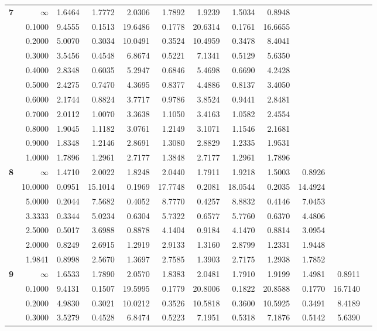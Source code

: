 \begin{table}[!htb]
\begin{center}
{\begin{tabular}{|c||r|r|r|r|r|r|r|r|r|r|r|}
\textbf{ 7}&$\infty$&1.6464&1.7772&2.0306&1.7892&1.9239&1.5034&0.8948&     &     &     \\
&0.1000&9.4555&0.1513&19.6486&0.1778&20.6314&0.1761&16.6655&     &     &     \\
&0.2000&5.0070&0.3034&10.0491&0.3524&10.4959&0.3478&8.4041&     &     &     \\
&0.3000&3.5456&0.4548&6.8674&0.5221&7.1341&0.5129&5.6350&     &     &     \\
&0.4000&2.8348&0.6035&5.2947&0.6846&5.4698&0.6690&4.2428&     &     &     \\
&0.5000&2.4275&0.7470&4.3695&0.8377&4.4886&0.8137&3.4050&     &     &     \\
&0.6000&2.1744&0.8824&3.7717&0.9786&3.8524&0.9441&2.8481&     &     &     \\
&0.7000&2.0112&1.0070&3.3638&1.1050&3.4163&1.0582&2.4554&     &     &     \\
&0.8000&1.9045&1.1182&3.0761&1.2149&3.1071&1.1546&2.1681&     &     &     \\
&0.9000&1.8348&1.2146&2.8691&1.3080&2.8829&1.2335&1.9531&     &     &     \\
&1.0000&1.7896&1.2961&2.7177&1.3848&2.7177&1.2961&1.7896&     &     &     \\ \hline
\textbf{ 8}&$\infty$&1.4710&2.0022&1.8248&2.0440&1.7911&1.9218&1.5003&0.8926&     &     \\
&10.0000&0.0951&15.1014&0.1969&17.7748&0.2081&18.0544&0.2035&14.4924&     &     \\
&5.0000&0.2044&7.5682&0.4052&8.7770&0.4257&8.8832&0.4146&7.0453&     &     \\
&3.3333&0.3344&5.0234&0.6304&5.7322&0.6577&5.7760&0.6370&4.4806&     &     \\
&2.5000&0.5017&3.6988&0.8878&4.1404&0.9184&4.1470&0.8814&3.0954&     &     \\
&2.0000&0.8249&2.6915&1.2919&2.9133&1.3160&2.8799&1.2331&1.9448&     &     \\
&1.9841&0.8998&2.5670&1.3697&2.7585&1.3903&2.7175&1.2938&1.7852&     &     \\ \hline
\textbf{ 9}&$\infty$&1.6533&1.7890&2.0570&1.8383&2.0481&1.7910&1.9199&1.4981&0.8911&     \\
&0.1000&9.4131&0.1507&19.5995&0.1779&20.8006&0.1822&20.8588&0.1770&16.7140&     \\
&0.2000&4.9830&0.3021&10.0212&0.3526&10.5818&0.3600&10.5925&0.3491&8.4189&     \\
&0.3000&3.5279&0.4528&6.8474&0.5223&7.1951&0.5318&7.1876&0.5142&5.6390&     \\

\end{tabular}}
\end{center}
\end{table}
